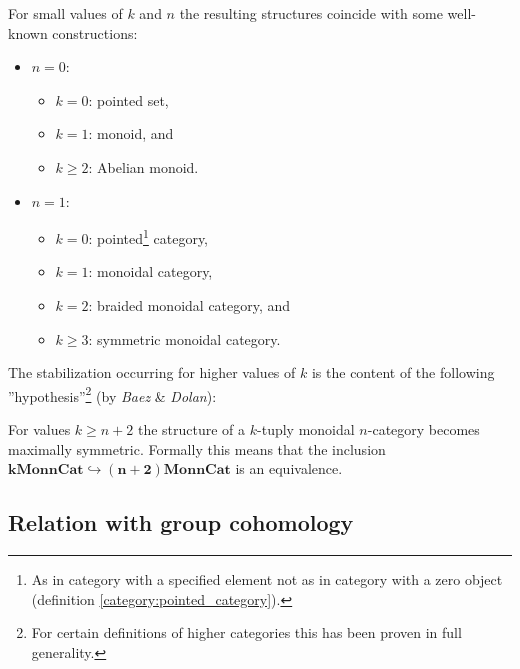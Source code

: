     \begin{example}
        For small values of $k$ and $n$ the resulting structures coincide with some well-known constructions:
        \begin{itemize}
            \item $n=0$:
                \begin{itemize}
                    \item $k=0$: pointed set,
                    \item $k=1$: monoid, and
                    \item $k\geq2$: Abelian monoid.
                \end{itemize}
            \item $n=1$:
                \begin{itemize}
                    \item $k=0$: pointed\footnote{As in category with a specified element not as in category with a zero object (definition \ref{category:pointed_category}).} category,
                    \item $k=1$: monoidal category,
                    \item $k=2$: braided monoidal category, and
                    \item $k\geq3$: symmetric monoidal category.
                \end{itemize}
        \end{itemize}
    \end{example}
    The stabilization occurring for higher values of $k$ is the content of the following ''hypothesis''\footnote{For certain definitions of higher categories this has been proven in full generality.} (by \textit{Baez} \& \textit{Dolan}):
    \begin{theorem}
        For values $k\geq n+2$ the structure of a $k$-tuply monoidal $n$-category becomes maximally symmetric. Formally this means that the inclusion \emph{$\boldsymbol{k}\mathbf{Mon}\boldsymbol{n}\mathbf{Cat}\hookrightarrow\boldsymbol{(n+2)}\mathbf{Mon}\boldsymbol{n}\mathbf{Cat}$} is an equivalence.
    \end{theorem}

\subsection[Relation to group cohomology]{Relation with group cohomology\footnotemark}\label{section:hda_group_cohomology}

